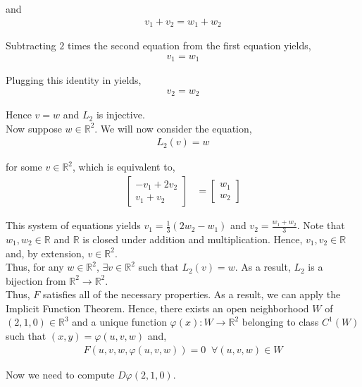 \documentclass[12pt]{article}
\newenvironment{problem}[2][Problem]{\begin{trivlist}
\item[\hskip \labelsep {\bfseries #1}\hskip \labelsep {\bfseries #2.}]}{\end{trivlist}}
\begin{document}
and 
\begin{align*}
v_1 + v_2 = w_1 + w_2
\end{align*}

Subtracting $2$ times the second equation from the first equation yields,
\begin{align*}
v_1 = w_1
\end{align*}

Plugging this identity in yields,
\begin{align*}
v_2 = w_2
\end{align*}

Hence $v = w$ and $L_2$ is injective.\\

Now suppose $w \in \mathbb{R}^2$. We will now consider the equation,
\begin{align*}
L_2(v) = w
\end{align*}

for some $v \in \mathbb{R}^2$, which is equivalent to,
\begin{align*}
\begin{bmatrix}
-v_1 + 2v_2 \\
v_1 + v_2
\end{bmatrix} &= \begin{bmatrix} w_1 \\ w_2 \end{bmatrix}
\end{align*}

This system of equations yields $v_1 = \frac{1}{3} (2w_2 - w_1)$ and $v_2 = \frac{w_1 + w_2}{3}$. Note that $w_1, w_2 \in \mathbb{R}$ and $\mathbb{R}$ is closed under addition and multiplication. Hence, $v_1, v_2 \in \mathbb{R}$ and, by extension, $v \in \mathbb{R}^2$.\\

Thus, for any $w \in \mathbb{R}^2$, $\exists v \in \mathbb{R}^2$ such that $L_2(v) = w$. As a result, $L_2$ is a bijection from $\mathbb{R}^2 \to \mathbb{R}^2$.\\

Thus, $F$ satisfies all of the necessary properties. As a result, we can apply the Implicit Function Theorem. Hence, there exists an open neighborhood $W$ of $(2, 1, 0) \in \mathbb{R}^3$ and a unique function $\varphi(x): W \to \mathbb{R}^2$ belonging to class $C^1(W)$ such that $(x, y)= \varphi(u, v, w)$ and,
\begin{align*}
F(u, v, w, \varphi(u, v, w)) = 0 \;\; \forall (u, v, w) \in W
\end{align*}

Now we need to compute $D\varphi (2, 1, 0)$.

\begin{problem}{3}
\end{problem}

\begin{problem}{4}
\end{problem}

\begin{problem}{5}
\end{problem}
\end{document}

